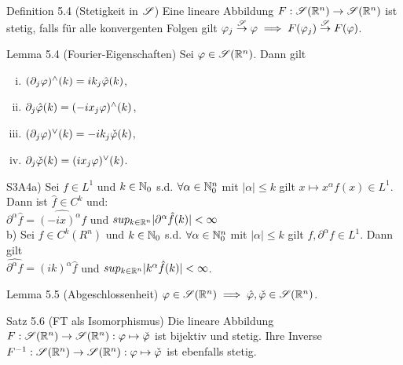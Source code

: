 \begin{namedtheorem}{Definition 5.4 (Stetigkeit in $\mathscr{S}$)}
  Eine lineare Abbildung $F:\mathscr{S}(\mathbb{R}^n)\rightarrow\mathscr{S}(\mathbb{R}^n)$ ist stetig, falls für alle konvergenten Folgen gilt $\varphi_j \overset{\mathscr{S}}{\rightarrow} \varphi \implies F(\varphi_j) \overset{\mathscr{S}}{\rightarrow} F(\varphi)$.
\end{namedtheorem}

\begin{namedtheorem}{Lemma 5.4 (Fourier-Eigenschaften)}
  Sei $\varphi\in\mathscr{S}(\mathbb{R}^n)$. Dann gilt
  {\setlength\multicolsep{4pt}%
  \begin{multicols}{2}
    \begin{enumerate}[(i)]
      \item $(\partial_j\varphi){}^{\wedge}(k) = ik_j\hat{\varphi}(k)$,
      \item $\partial_j\hat{\varphi}(k) = (-ix_j\varphi){}^{\wedge}(k)$,
      \item $(\partial_j\varphi){}^{\vee}(k) = -ik_j\check{\varphi}(k)$,
      \item $\partial_j\check{\varphi}(k) = (ix_j\varphi){}^{\vee}(k)$.
    \end{enumerate}
  \end{multicols}}
\end{namedtheorem}

\begin{namedtheorem}{S3A4}a) Sei $f\in L^1$ und $k\in\mathbb{N}_0$ s.d. $\forall\alpha\in\mathbb{N}^n_0$ mit $|\alpha|\leq k$ gilt $x\mapsto x^\alpha f(x)\in L^1$. Dann ist $\hat{f}\in C^k$ und:\\
$\partial^\alpha \hat{f}=\hat{(-ix)^\alpha f}$ und $sup_{k\in\mathbb{R}^n}|\partial^\alpha\hat{f}(k)|<\infty$\\
b) Sei $f\in C^k(R^n)$ und $k\in\mathbb{N}_0$ s.d. $\forall \alpha\in\mathbb{N}^n_0$ mit $|\alpha|\leq k$ gilt $f,\partial^\alpha f\in L^1$. Dann gilt\\
$\hat{\partial^\alpha f}=(ik)^\alpha\hat{f}$ und $sup_{k\in\mathbb{R}^n}|k^\alpha \hat{f}(k)|<\infty$.
\end{namedtheorem}

\begin{namedtheorem}{Lemma 5.5 (Abgeschlossenheit)}
  $\varphi\in\mathscr{S}(\mathbb{R}^n) \implies \hat{\varphi}, \check{\varphi} \in \mathscr{S}(\mathbb{R}^n)$.
\end{namedtheorem}

\begin{namedtheorem}{Satz 5.6 (FT als Isomorphismus)}
  Die lineare Abbildung $F:\mathscr{S}(\mathbb{R}^n)\rightarrow\mathscr{S}(\mathbb{R}^n): \varphi\mapsto\check{\varphi}$ ist bijektiv und stetig. Ihre Inverse $F^{-1}:\mathscr{S}(\mathbb{R}^n) \rightarrow \mathscr{S}(\mathbb{R}^n): \varphi\mapsto\check{\varphi}$ ist ebenfalls stetig.
\end{namedtheorem}



